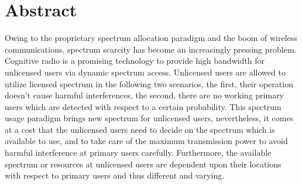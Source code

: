 \chapter{Abstract}
Owing to the proprietary spectrum allocation paradigm and the boom of wireless communications, spectrum scarcity has become an increasingly pressing problem. 
Cognitive radio is a promising technology to provide high bandwidth for unlicensed users via dynamic spectrum access. 
Unlicensed users are allowed to utilize licensed spectrum in the following two scenarios, the first, their operation doesn't cause harmful interferences, the second, there are no working primary users which are detected with respect to a certain probability.
This spectrum usage paradigm brings new spectrum for unlicensed users, nevertheless, it comes at a cost that the unlicensed users need to decide on the spectrum which is available to use, and to take care of the maximum transmission power to avoid harmful interference at primary users carefully.
Furthermore, the available spectrum or resources at unlicensed users are dependent upon their locations with respect to primary users and thus different and varying.

